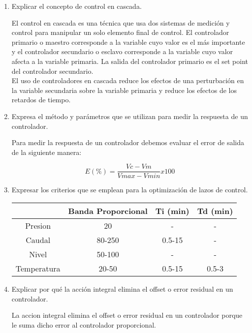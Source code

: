 \documentclass[10pt,a4paper,spanish]{article}
\begin{document}
\begin{enumerate}
    \item Explicar el concepto de control en cascada.

    \noindent
    El control en cascada es una técnica que usa dos sistemas de medición y control para manipular un solo elemento final de control. El controlador primario o maestro corresponde a la variable cuyo valor es el más importante y el controlador secundario o esclavo corresponde a la variable cuyo valor afecta a la variable primaria. La salida del controlador primario es el set point del controlador secundario. \\

    \noindent
    El uso de controladores en cascada reduce los efectos de una perturbación en la variable secundaria sobre la variable primaria y reduce los efectos de los retardos de tiempo.

    \item Expresa el método y parámetros que se utilizan para medir la respuesta de un controlador.

    \noindent
    Para medir la respuesta de un controlador debemos evaluar el error de salida de la siguiente manera:

    \begin{displaymath}
      E(\%) = \frac{Vc - Vm}{Vmax - Vmin} x 100
    \end{displaymath}

    \item Expresar los criterios que se emplean para la optimización de lazos de control.

    \begin{table}[htb]
      \centering
      \begin{tabular}{|c|c|c|c|}
      \hline
      & Banda Proporcional & Ti (min) & Td (min) \\ \hline
      Presion & 20 & - & - \\ \hline
      Caudal & 80-250 & 0.5-15 & - \\ \hline
      Nivel & 50-100 & - & - \\ \hline
      Temperatura & 20-50 & 0.5-15 & 0.5-3 \\ \hline
      \end{tabular}
    \end{table}

    \item Explicar por qué la acción integral elimina el offset o error residual en un controlador.

    \noindent
    La accion integral elimina el offset o error residual en un controlador porque le suma dicho error al controlador proporcional.



\end{enumerate}
\end{document}
